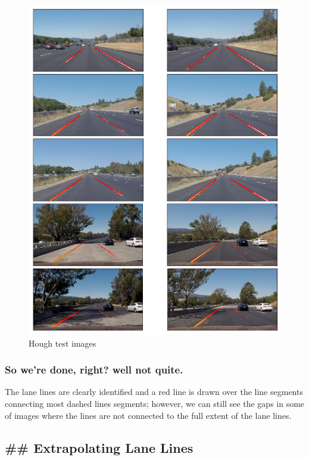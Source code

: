 \documentclass[11pt]{article}
\makeatletter
\def\maxwidth{\ifdim\Gin@nat@width>\linewidth\linewidth
    \else\Gin@nat@width\fi}
\let\Oldincludegraphics\includegraphics
\renewcommand{\includegraphics}[1]{\Oldincludegraphics[width=.8\maxwidth]{#1}}
\makeatother
\begin{document}
\begin{figure}
\centering
\includegraphics{test_images_output/hough_test_images.png}
\caption{Hough test images}
\end{figure}

\hypertarget{so-were-done-right-well-not-quite.}{%
\subsubsection{So we're done, right? well not
quite.}\label{so-were-done-right-well-not-quite.}}

The lane lines are clearly identified and a red line is drawn over the
line segments connecting most dashed lines segments; however, we can
still see the gaps in some of images where the lines are not connected
to the full extent of the lane lines.

\hypertarget{extrapolating-lane-lines}{%
\subsection{\#\# Extrapolating Lane
Lines}\label{extrapolating-lane-lines}}
\end{document}
